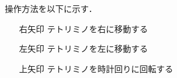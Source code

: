 操作方法を以下に示す．
\begin{itemize}
  \item[右矢印] テトリミノを右に移動する
  \item[左矢印] テトリミノを左に移動する
  \item[上矢印] テトリミノを時計回りに回転する
\end{itemize}
